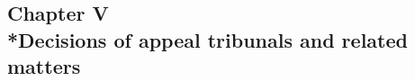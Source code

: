 \documentclass[12pt,a4paper]{article}
\begin{document}
%
%
%
%
%
%
%
%
%
%

\subsection[Chapter V --- Decisions of appeal tribunals and related matters]{Chapter V\\*Decisions of appeal tribunals and related matters}
\end{document}
